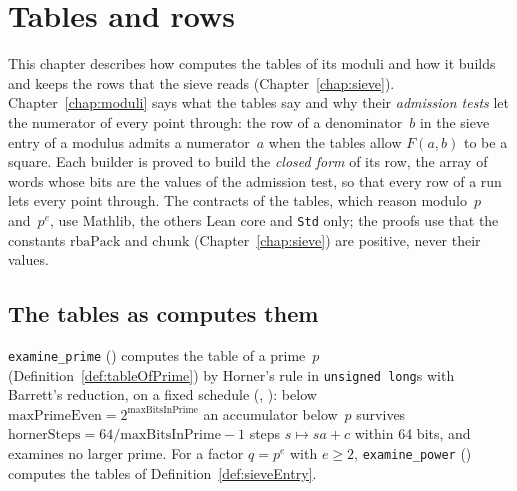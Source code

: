 \chapter{Tables and rows}\label{chap:rows}

This chapter describes how \ratpoints{} computes the tables of its moduli and how it builds and keeps
the rows that the sieve reads (Chapter~\ref{chap:sieve}). Chapter~\ref{chap:moduli} says what the
tables say and why their \emph{admission tests} let the numerator of every point through: the row
of a denominator~$b$ in the sieve entry of a modulus admits a numerator~$a$ when the tables allow
$F(a, b)$ to be a square. Each builder is proved to build the \emph{closed form} of its row, the
array of words whose bits are the values of the admission test, so that every row of a run lets
every point through. The contracts of the tables, which reason modulo~$p$ and~$p^e$, use Mathlib,
the others Lean core and \verb|Std| only; the proofs use that the constants $\mathrm{rbaPack}$ and
$\mathrm{chunk}$ (Chapter~\ref{chap:sieve}) are positive, never their values.

\section{The tables as \ratpoints{} computes them}\label{sec:rowsResidues}

\verb|examine_prime| () computes the table of a prime~$p$
(Definition~\ref{def:tableOfPrime}) by Horner's rule in \verb|unsigned long|s with Barrett's
reduction, on a fixed schedule (,
): below $\mathrm{maxPrimeEven} = 2^{\mathrm{maxBitsInPrime}}$
an accumulator below~$p$ survives $\mathrm{hornerSteps} = 64/\mathrm{maxBitsInPrime} - 1$ steps
$s \mapsto s a + c$ within 64 bits, and \ratpoints{} examines no larger prime. For a factor $q = p^e$
with $e \ge 2$, \verb|examine_power| () computes the tables of
Definition~\ref{def:sieveEntry}.

